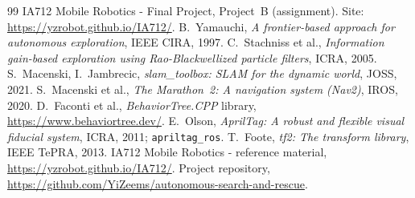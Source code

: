 \documentclass[11pt,a4paper]{article}
\begin{document}
\begingroup
\small
\begin{thebibliography}{99}
\setlength{\itemsep}{0pt}
 IA712 Mobile Robotics - Final Project, Project~B (assignment). Site: \url{https://yzrobot.github.io/IA712/}.
 B.~Yamauchi, \emph{A frontier-based approach for autonomous exploration}, IEEE CIRA, 1997.
 C.~Stachniss et al., \emph{Information gain-based exploration using Rao-Blackwellized particle filters}, ICRA, 2005.
 S.~Macenski, I.~Jambrecic, \emph{slam\_toolbox: SLAM for the dynamic world}, JOSS, 2021.
 S.~Macenski et al., \emph{The Marathon~2: A navigation system (Nav2)}, IROS, 2020.
 D.~Faconti et al., \emph{BehaviorTree.CPP} library, \url{https://www.behaviortree.dev/}.
 E.~Olson, \emph{AprilTag: A robust and flexible visual fiducial system}, ICRA, 2011; \texttt{apriltag\_ros}.
 T.~Foote, \emph{tf2: The transform library}, IEEE TePRA, 2013.
 IA712 Mobile Robotics - reference material, \url{https://yzrobot.github.io/IA712/}.
 Project repository, \url{https://github.com/YiZeems/autonomous-search-and-rescue}.
\end{thebibliography}
\endgroup
\end{document}
